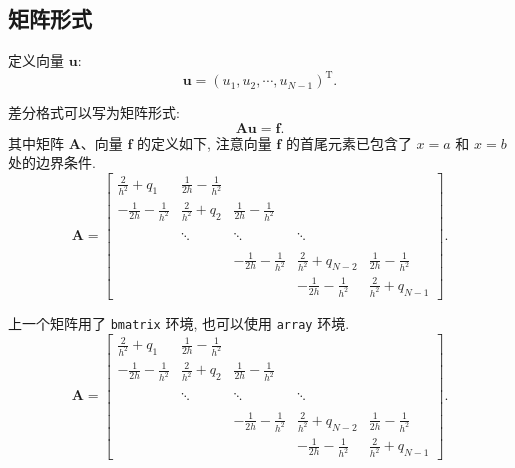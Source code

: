 \subsection{矩阵形式}

定义向量 $\boldsymbol{u}$:
\begin{equation*}
  \boldsymbol{u}=(u_{1}, u_{2}, \cdots, u_{N-1})^{\mathrm{T}}.
\end{equation*}

差分格式可以写为矩阵形式:
\begin{equation*}
  \boldsymbol{A}\boldsymbol{u}=\boldsymbol{f}.
\end{equation*}
其中矩阵 $\boldsymbol{A}$、向量 $\boldsymbol{f}$ 的定义如下, 注意向量 $\boldsymbol{f}$ 的首尾元素已包含了 $x=a$ 和 $x=b$ 处的边界条件.
\begin{equation}\label{eq:matrix1}
\boldsymbol{A}=\begin{bmatrix}
\frac{2}{h^{2}}+q_{1} & \frac{1}{2h}-\frac{1}{h^{2}} &   &  &  \\[8pt]
 -\frac{1}{2h}-\frac{1}{h^{2}} & \frac{2}{h^{2}}+q_{2} & \frac{1}{2h}-\frac{1}{h^{2}}  & &  \\[8pt]
  &  &  &  &    \\
  &  \ddots  & \ddots  &  \ddots  &  \\[8pt]
  &  &  &  &    \\
  &   & -\frac{1}{2h}-\frac{1}{h^{2}} & \frac{2}{h^{2}}+q_{N-2}& \frac{1}{2h}-\frac{1}{h^{2}} \\[8pt]
  &  &  & -\frac{1}{2h}-\frac{1}{h^{2}} & \frac{2}{h^{2}}+q_{N-1}
\end{bmatrix}.
\end{equation}

上一个矩阵用了 \verb|bmatrix| 环境, 也可以使用 \verb|array| 环境.
\begin{equation}\label{eq:matrix2}
\boldsymbol{A}=\left[\begin{array}{cccccc}
\frac{2}{h^{2}}+q_{1} & \frac{1}{2h}-\frac{1}{h^{2}} &  &  &  \\[8pt]
 -\frac{1}{2h}-\frac{1}{h^{2}} & \frac{2}{h^{2}}+q_{2} & \frac{1}{2h}-\frac{1}{h^{2}}  & &  \\[8pt]
  &  &  &  &   \\
  &  \ddots  & \ddots & \ddots &  \\[8pt]
  &  &  &  &   \\
  &   & -\frac{1}{2h}-\frac{1}{h^{2}} & \frac{2}{h^{2}}+q_{N-2} & \frac{1}{2h}-\frac{1}{h^{2}} \\[8pt]
  &  &  & -\frac{1}{2h}-\frac{1}{h^{2}} & \frac{2}{h^{2}}+q_{N-1}
\end{array}\right].
\end{equation}

